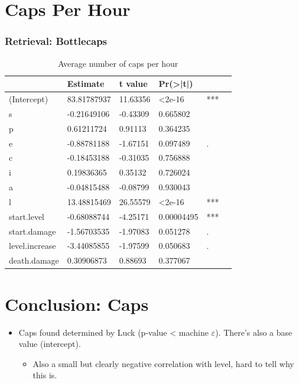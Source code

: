 \documentclass{beamer}
\begin{document}
\section{Caps Per Hour}
\begin{frame}
  \frametitle{Retrieval: Bottlecaps}
  \begin{table}
\caption{Average number of caps per hour}
\label{table:caps}
\begin{tabular}{l|lllll}
&Estimate&t value&Pr(>|t|)&\\  
\hline  
(Intercept)&83.81787937  &  11.63356 &<2e-16& ***\\
s &-0.21649106   & -0.43309 &    0.665802 &   \\
p&  0.61211724    & 0.91113 &   0.364235 &   \\
e & -0.88781188    &-1.67151 &   0.097489 &  . \\
c&-0.18453188  &  -0.31035  &  0.756888 &   \\
i& 0.19836365    & 0.35132  &  0.726024 &   \\
a  & -0.04815488  & -0.08799 &   0.930043&    \\
l &   13.48815469   & 26.55579&  <2e-16& ***\\
start.level &  -0.68088744   &  -4.25171 &   0.00004495 & *** \\ 
start.damage& -1.56703535   & -1.97083 &   0.051278 & . \\ 
level.increase & -3.44085855  & -1.97599 &   0.050683 &.  \\ 
death.damage & 0.30906873   &  0.88693  &  0.377067&\\
\hline
\end{tabular}
\end{table}
\end{frame}


\section{Conclusion: Caps}
\begin{frame}
\begin{itemize}
  \item Caps found determined by Luck (p-value < machine $\varepsilon$). There's also a base value (intercept).
  \begin{itemize}
  \item Also a small but clearly negative correlation with level, hard to tell why this is.
  \end{itemize}
  \end{itemize}
\end{frame}
\end{document}
